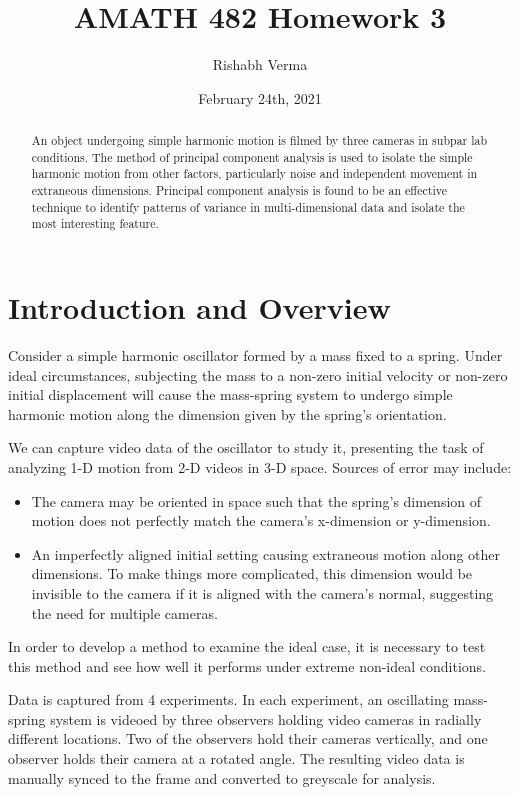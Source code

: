 \documentclass{article}
\title{AMATH 482 Homework 3}
\author{Rishabh Verma}
\date{February 24th, 2021}
\begin{document}
\maketitle

\begin{abstract}
    An object undergoing simple harmonic motion is filmed by three cameras in subpar lab conditions. The method of principal component analysis is used to isolate the simple harmonic motion from other factors, particularly noise and independent movement in extraneous dimensions. Principal component analysis is found to be an effective technique to identify patterns of variance in multi-dimensional data and isolate the most interesting feature.
\end{abstract}

\section{Introduction and Overview}
Consider a simple harmonic oscillator formed by a mass fixed to a spring. Under ideal circumstances, subjecting the mass to a non-zero initial velocity or non-zero initial displacement will cause the mass-spring system to undergo simple harmonic motion along the dimension given by the spring's orientation.

We can capture video data of the oscillator to study it, presenting the task of analyzing 1-D motion from 2-D videos in 3-D space. Sources of error may include:

\begin{itemize}
	\item The camera may be oriented in space such that the spring's dimension of motion does not perfectly match the camera's x-dimension or y-dimension.
	
	\item An imperfectly aligned initial setting causing extraneous motion along other dimensions. To make things more complicated, this dimension would be invisible to the camera if it is aligned with the camera's normal, suggesting the need for multiple cameras.
\end{itemize}

In order to develop a method to examine the ideal case, it is necessary to test this method and see how well it performs under extreme non-ideal conditions.

Data is captured from 4 experiments. In each experiment, an oscillating mass-spring system is videoed by three observers holding video cameras in radially different locations. Two of the observers hold their cameras vertically, and one observer holds their camera at a rotated angle. The resulting video data is manually synced to the frame and converted to greyscale for analysis.
\end{document}
